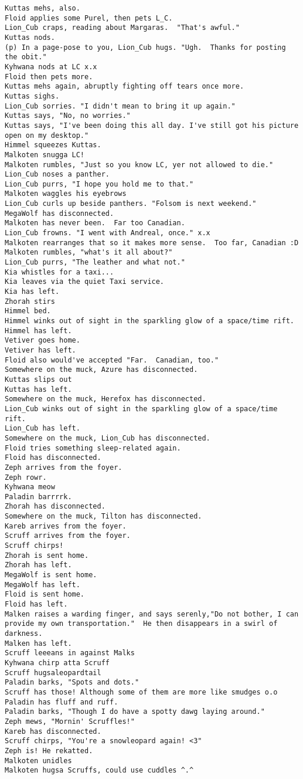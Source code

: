 \begin{verbatim}
Kuttas mehs, also.
Floid applies some Purel, then pets L_C.
Lion_Cub craps, reading about Margaras.  "That's awful."
Kuttas nods.
(p) In a page-pose to you, Lion_Cub hugs. "Ugh.  Thanks for posting the obit."
Kyhwana nods at LC x.x
Floid then pets more.
Kuttas mehs again, abruptly fighting off tears once more.
Kuttas sighs.
Lion_Cub sorries. "I didn't mean to bring it up again."
Kuttas says, "No, no worries."
Kuttas says, "I've been doing this all day. I've still got his picture open on my desktop."
Himmel squeezes Kuttas.
Malkoten snugga LC!
Malkoten rumbles, "Just so you know LC, yer not allowed to die."
Lion_Cub noses a panther.
Lion_Cub purrs, "I hope you hold me to that."
Malkoten waggles his eyebrows
Lion_Cub curls up beside panthers. "Folsom is next weekend."
MegaWolf has disconnected.
Malkoten has never been.  Far too Canadian.
Lion_Cub frowns. "I went with Andreal, once." x.x
Malkoten rearranges that so it makes more sense.  Too far, Canadian :D
Malkoten rumbles, "what's it all about?"
Lion_Cub purrs, "The leather and what not."
Kia whistles for a taxi...
Kia leaves via the quiet Taxi service.
Kia has left.
Zhorah stirs
Himmel bed.
Himmel winks out of sight in the sparkling glow of a space/time rift.
Himmel has left.
Vetiver goes home.
Vetiver has left.
Floid also would've accepted "Far.  Canadian, too."
Somewhere on the muck, Azure has disconnected.
Kuttas slips out
Kuttas has left.
Somewhere on the muck, Herefox has disconnected.
Lion_Cub winks out of sight in the sparkling glow of a space/time rift.
Lion_Cub has left.
Somewhere on the muck, Lion_Cub has disconnected.
Floid tries something sleep-related again.
Floid has disconnected.
Zeph arrives from the foyer.
Zeph rowr.
Kyhwana meow
Paladin barrrrk.
Zhorah has disconnected.
Somewhere on the muck, Tilton has disconnected.
Kareb arrives from the foyer.
Scruff arrives from the foyer.
Scruff chirps!
Zhorah is sent home.
Zhorah has left.
MegaWolf is sent home.
MegaWolf has left.
Floid is sent home.
Floid has left.
Malken raises a warding finger, and says serenly,"Do not bother, I can provide my own transportation."  He then disappears in a swirl of darkness.
Malken has left.
Scruff leeeans in against Malks
Kyhwana chirp atta Scruff
Scruff hugsaleopardtail
Paladin barks, "Spots and dots."
Scruff has those! Although some of them are more like smudges o.o
Paladin has fluff and ruff.
Paladin barks, "Though I do have a spotty dawg laying around."
Zeph mews, "Mornin' Scruffles!"
Kareb has disconnected.
Scruff chirps, "You're a snowleopard again! <3"
Zeph is! He rekatted.
Malkoten unidles
Malkoten hugsa Scruffs, could use cuddles ^.^

\end{verbatim}
